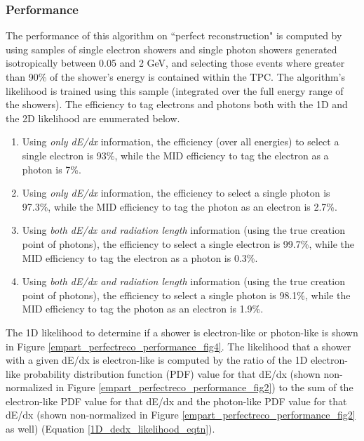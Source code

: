 \subsubsection{Performance}\label{empart_perfectreco_performance}
The performance of this algorithm on ``perfect reconstruction" is computed by using samples of single electron showers and single photon showers generated isotropically between 0.05 and 2 GeV, and selecting those events where greater than 90\% of the shower's energy is contained within the TPC. The algorithm's likelihood is trained using this sample (integrated over the full energy range of the showers). The efficiency to tag electrons and photons both with the 1D and the 2D likelihood are enumerated below.
\begin{enumerate}
\item Using \textit{only dE/dx} information, the efficiency (over all energies) to select a single electron is 93\%, while the MID efficiency to tag the electron as a photon is 7\%. 
\item Using \textit{only dE/dx} information, the efficiency to select a single photon is 97.3\%, while the MID efficiency to tag the photon as an electron is 2.7\%.
\item Using \textit{both dE/dx and radiation length} information (using the true creation point of photons), the efficiency to select a single electron is 99.7\%, while the MID efficiency to tag the electron as a photon is 0.3\%. 
\item Using \textit{both dE/dx and radiation length} information (using the true creation point of photons), the efficiency to select a single photon is 98.1\%, while the MID efficiency to tag the photon as an electron is 1.9\%.
\end{enumerate}


The 1D likelihood to determine if a shower is electron-like or photon-like is shown in Figure \ref{empart_perfectreco_performance_fig4}. The likelihood that a shower with a given dE/dx is electron-like is computed by the ratio of the 1D electron-like probability distribution function (PDF) value for that dE/dx (shown non-normalized in Figure \ref{empart_perfectreco_performance_fig2}) to the sum of the electron-like PDF value for that dE/dx and the photon-like PDF value for that dE/dx (shown non-normalized in Figure \ref{empart_perfectreco_performance_fig2} as well) (Equation \ref{1D_dedx_likelihood_eqtn}). 

